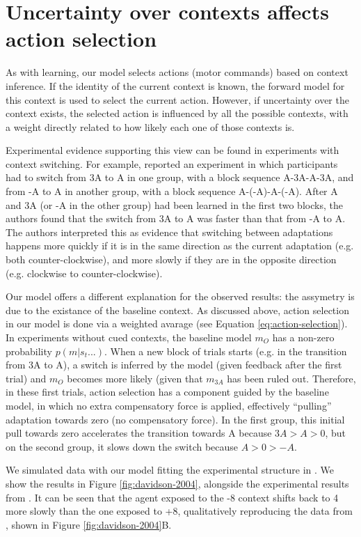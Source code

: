 \documentclass[a4paper,doc,floatsintext,natbib]{apa6}
\def \fref #1{Figure \ref{#1}}     %
\def \eref #1{Equation \ref{#1}}   %
\begin{document}
\section{Uncertainty over contexts affects action selection}
As with learning, our model selects actions (motor commands) based on context inference. If the identity of the current context is known, the forward model for this context is used to select the current action. However, if uncertainty over the context exists, the selected action is influenced by all the possible contexts, with a weight directly related to how likely each one of those contexts is.

Experimental evidence supporting this view can be found in experiments with context switching. For example, \cite{Davidson_Scaling_2004} reported an experiment in which participants had to switch from 3A to A in one group, with a block sequence A-3A-A-3A, and from -A to A in another group, with a block sequence A-(-A)-A-(-A). After A and 3A (or -A in the other group) had been learned in the first two blocks, the authors found that the switch from 3A to A was faster than that from -A to A. The authors interpreted this as evidence that switching between adaptations happens more quickly if it is in the same direction as the current adaptation (e.g. both counter-clockwise), and more slowly if they are in the opposite direction (e.g. clockwise to counter-clockwise).

Our model offers a different explanation for the observed results: the assymetry is due to the existance of the baseline context. As discussed above, action selection in our model is done via a weighted avarage (see \eref{eq:action-selection}). In experiments without cued contexts, the baseline model $m_O$ has a non-zero probability $p(m | s_t ...)$. When a new block of trials starts (e.g. in the transition from 3A to A), a switch is inferred by the model (given feedback after the first trial) and $m_O$ becomes more likely (given that $m_{3A}$ has been ruled out. Therefore, in these first trials, action selection has a component guided by the baseline model, in which no extra compensatory force is applied, effectively ``pulling'' adaptation towards zero (no compensatory force). In the first group, this initial pull towards zero accelerates the transition towards A because $3A > A > 0$, but on the second group, it slows down the switch because $A > 0 > -A$.

We simulated data with our model fitting the experimental structure in \cite{Davidson_Scaling_2004}. We show the results in \fref{fig:davidson-2004}, alongside the experimental results from \cite{Davidson_Scaling_2004}. It can be seen that the agent exposed to the -8 context shifts back to 4 more slowly than the one exposed to +8, qualitatively reproducing the data from \cite{Davidson_Scaling_2004}, shown in \fref{fig:davidson-2004}B.
\end{document}
